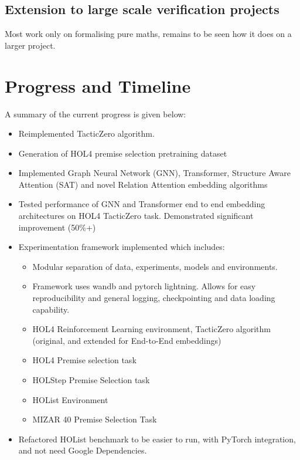 \documentclass{article}
\begin{document}
    \subsection{Extension to large scale verification projects}\label{subsec:extension-to-large-scale-verification-projects}
    Most work only on formalising pure maths, remains to be seen how it does on a larger project.


    \section{Progress and Timeline}\label{sec:progress-and-timeline}
    A summary of the current progress is given below:

    \begin{itemize}
        \item Reimplemented TacticZero algorithm.
        \item Generation of HOL4 premise selection pretraining dataset
        \item Implemented Graph Neural Network (GNN), Transformer, Structure Aware Attention (SAT) and novel Relation Attention embedding algorithms
        \item Tested performance of GNN and Transformer end to end embedding architectures on HOL4 TacticZero task.
        Demonstrated significant improvement (50\%+)
        \item Experimentation framework implemented which includes:
        \begin{itemize}
            \item Modular separation of data, experiments, models and environments.
            \item Framework uses wandb and pytorch lightning.
            Allows for easy reproducibility and general logging, checkpointing and data loading capability.
            \item HOL4 Reinforcement Learning environment, TacticZero algorithm (original, and extended for End-to-End embeddings)
            \item HOL4 Premise selection task
            \item HOLStep Premise Selection task
            \item HOList Environment
            \item MIZAR 40 Premise Selection Task
        \end{itemize}
        \item Refactored HOList benchmark to be easier to run, with PyTorch integration, and not need Google Dependencies.
    \end{itemize}


    \printbibliography
\end{document}
